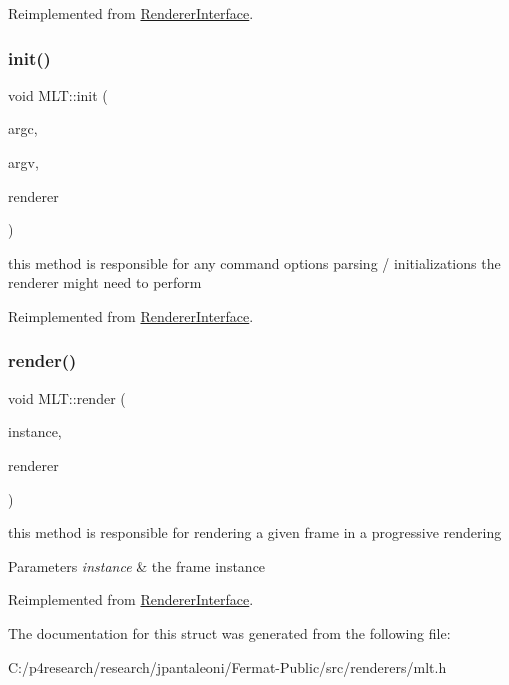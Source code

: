 Reimplemented from \hyperlink{struct_renderer_interface_a7469218aafa029a3e22bac2c00dca9f5}{Renderer\+Interface}.

\mbox{\label{struct_m_l_t_a3e5f5dc01f80a3c599384660163ad3d7}} 
\subsubsection{\texorpdfstring{init()}{init()}}
{\footnotesize\ttfamily void M\+L\+T\+::init (\begin{DoxyParamCaption}\item[{int}]{argc,  }\item[{char $\ast$$\ast$}]{argv,  }\item[{\hyperlink{struct_rendering_context}{Rendering\+Context} \&}]{renderer }\end{DoxyParamCaption})\hspace{0.3cm}{\ttfamily [virtual]}}

this method is responsible for any command options parsing / initializations the renderer might need to perform 

Reimplemented from \hyperlink{struct_renderer_interface_a2ead9b943d6d48fcd32872e0005ebe63}{Renderer\+Interface}.

\mbox{\label{struct_m_l_t_ac7f187ec2fdd67baedb0cf1d74060b89}} 
\subsubsection{\texorpdfstring{render()}{render()}}
{\footnotesize\ttfamily void M\+L\+T\+::render (\begin{DoxyParamCaption}\item[{const uint32}]{instance,  }\item[{\hyperlink{struct_rendering_context}{Rendering\+Context} \&}]{renderer }\end{DoxyParamCaption})\hspace{0.3cm}{\ttfamily [virtual]}}

this method is responsible for rendering a given frame in a progressive rendering


\begin{DoxyParams}{Parameters}
{\em instance} & the frame instance \\
\hline
\end{DoxyParams}


Reimplemented from \hyperlink{struct_renderer_interface_aa64254dd44c94929b05092dc8d74f29d}{Renderer\+Interface}.



The documentation for this struct was generated from the following file\+:\begin{DoxyCompactItemize}
\item 
C\+:/p4research/research/jpantaleoni/\+Fermat-\/\+Public/src/renderers/mlt.\+h\end{DoxyCompactItemize}
